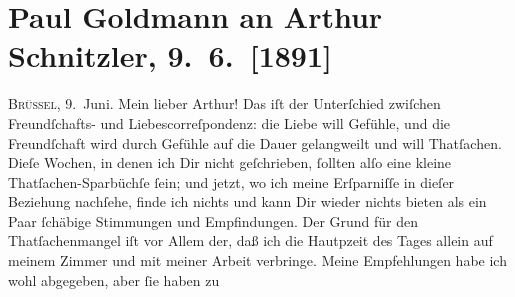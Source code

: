 

         
         \renewcommand{\erwaehntePersonen}{Personen:  ?? [Leiter einer Glasfabrik],  ?? [Schwester eines Glasfabrikanten], Richard Beer-Hofmann, Marie Glümer, Paul Goldmann, Clementine Goldmann, Hugo von Hofmannsthal, Jacob Jordaens, Friedrich Kapper, Fedor Mamroth, Peter Paul Rubens, Charles Tardieu, Boris Van-Jung, Richard Wagner, Olga Waissnix}
         \renewcommand{\erwaehnteInstitutionen}{Institutionen: ?? [Glasfabrik in Belgien], Frankfurter Zeitung, L’Indépendance Belge, Musées royaux des Beaux-Arts de Belgique}
         \renewcommand{\erwaehnteOrte}{Orte: Belgien, Brünn, Brüssel, Frankfurt am Main, Niederlande, Spanien, Wien, rue des Plantes}
         \renewcommand{\erwaehnteWerke}{}
               \section[Paul Goldmann an Arthur Schnitzler, 9. 6. {[}1891{]}]{ Paul Goldmann an Arthur Schnitzler, 9. 6. {[}1891{]}}\nopagebreak{}\rehead{ }\begin{ledgroupsized}[t]{13cm}\normalsize\beginnumbering{} \toendnotes[C]{\smallbreak\pagebreak[2]} 
\toendnotes[C]{\smallbreak}\pstart
           \raggedleft{}{\pb}\textsc{Brüssel}, 9. Juni.\pend
           \pstart\center{}Mein lieber Arthur!\pend\pstart
           Das iſt der Unterſchied zwiſchen Freundſchafts- und Liebescorreſpondenz: die Liebe
               will Gefühle, und die Freundſchaft wird durch Gefühle auf die Dauer gelangweilt und
               will Thatſachen. Dieſe Wochen, in denen ich Dir nicht geſchrieben, ſollten alſo eine
               kleine Thatſachen-Sparbüchſe ſein; und jetzt, wo ich meine Erſparniſſe in dieſer
               Beziehung nachſehe, finde ich nichts und kann Dir wieder nichts bieten als ein Paar
               ſchäbige Stimmungen und Empfindungen. Der Grund für den Thatſachenmangel iſt vor
               Allem der, daß ich die Hautpzeit des Tages allein auf meinem Zimmer und mit meiner
               Arbeit verbringe. Meine Empfehlungen habe ich wohl abgegeben, aber ſie haben zu

\end{ledgroupsized}
